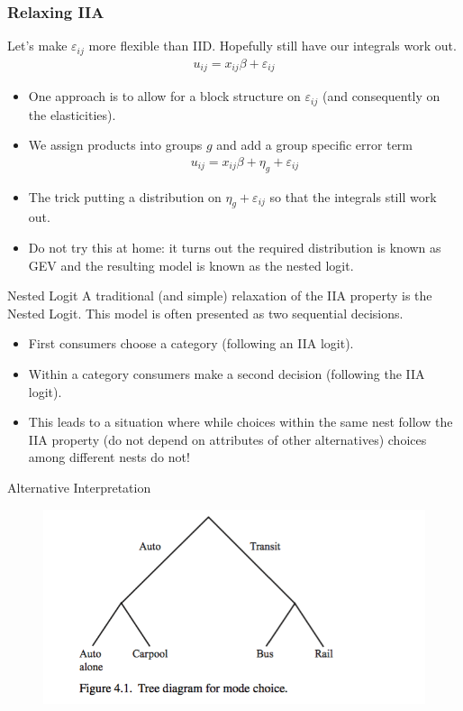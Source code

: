 \documentclass[xcolor=pdftex,dvipsnames,table,mathserif]{beamer}
\begin{document}
\begin{frame}
\frametitle{Relaxing IIA}
Let's make $\varepsilon_{ij}$ more flexible than IID. Hopefully still have our integrals work out.
\begin{eqnarray*}
u_{ij} =   x_{ij} \beta  + \varepsilon_{ij}
\end{eqnarray*}
\begin{itemize}
\item One approach is to allow for a block structure on $\varepsilon_{ij}$ (and consequently on the elasticities).
\item We assign products into groups $g$ and add a group specific error term
\begin{eqnarray*}
u_{ij} =   x_{ij} \beta  + \eta_{g} + \varepsilon_{ij}
\end{eqnarray*}
\item The trick putting a distribution on $\eta_g + \varepsilon_{ij}$ so that the integrals still work out.
\item Do not try this at home: it turns out the required distribution is known as \alert{GEV} and the resulting model is known as the \alert{nested logit}.
\end{itemize}
\end{frame}

\begin{frame}{Nested Logit}
A traditional (and simple) relaxation of the IIA property is the Nested Logit. This model is often presented as two sequential decisions.
\begin{itemize}
\item First consumers choose a category (following an IIA logit).
\item Within a category consumers make a second decision (following the IIA logit).
\item This leads to a situation where while choices within the same nest follow the IIA property (do not depend on attributes of other alternatives) choices among different nests do not!
\end{itemize}
\end{frame}

\begin{frame}{Alternative Interpretation}
\begin{figure}[htbp]
\begin{center}
\includegraphics[width=5in]{resources/nesting.png}
\end{center}
\end{figure}
\end{frame}
\end{document}
